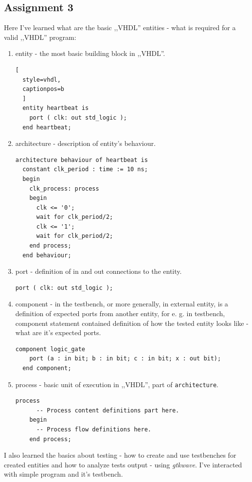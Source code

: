 \subsection{Assignment 3}

Here I've learned what are the basic ,,VHDL'' entities - what is required for
a valid ,,VHDL'' program:
\begin{enumerate}
  \item entity - the most basic building block in ,,VHDL''.
\begin{lstlisting}[
  style=vhdl,
  captionpos=b
  ]
  entity heartbeat is
    port ( clk: out std_logic );
  end heartbeat;
\end{lstlisting}
  \item architecture - description of entity's behaviour.
\begin{lstlisting}[style=vhdl, captionpos=b]
  architecture behaviour of heartbeat is
  constant clk_period : time := 10 ns;
  begin
    clk_process: process
    begin
      clk <= '0';
      wait for clk_period/2;
      clk <= '1';
      wait for clk_period/2;
    end process;
  end behaviour;
\end{lstlisting}
  \item port - definition of in and out connections to the entity.
  \begin{lstlisting}[style=vhdl]
  port ( clk: out std_logic );
  \end{lstlisting}
  \item component - in the testbench, or more generally, in external entity,
        is a definition of expected ports from another entity, for e. g.
        in testbench, component statement contained definition of how the
        tested entity looks like - what are it's expected ports.
  \begin{lstlisting}[style=vhdl]
  component logic_gate
    port (a : in bit; b : in bit; c : in bit; x : out bit);
  end component;
  \end{lstlisting}
  \item process - basic unit of execution in ,,VHDL'', part of \texttt{architecture}.
  \begin{lstlisting}[style=vhdl]
    process
      -- Process content definitions part here.
    begin
      -- Process flow definitions here.
    end process;
    \end{lstlisting}
\end{enumerate}

I also learned the basics about testing - how to create and use testbenches
for created entities and how to analyze tests output - using \textit{gtkwave}.
I've interacted with simple program and it's testbench.

